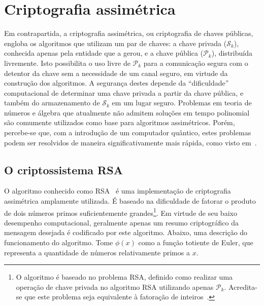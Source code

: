 \documentclass[12pt]{report}
\newcommand{\pk}{$\mathcal{P}_k$}
\newcommand{\sk}{$\mathcal{S}_k$}
\begin{document}
\section{Criptografia assimétrica}

Em contrapartida, a criptografia assimétrica, ou criptografia de chaves
públicas, engloba os algoritmos que utilizam um par de chaves: a chave privada
(\sk{}), conhecida apenas pela entidade que a gerou, e a chave pública (\pk{}),
distribuída livremente. Isto possibilita o uso livre de \pk{} para a
comunicação segura com o detentor da chave sem a necessidade de um canal
seguro, em virtude da construção dos algoritmos. A segurança destes depende da
``dificuldade'' computacional de determinar uma chave privada a partir da chave
pública, e também do armazenamento de \sk{} em um lugar seguro. Problemas em
teoria de números e álgebra que atualmente não admitem soluções em tempo
polinomial são comumente utilizados como base para algoritmos assimétricos.
Porém, percebe-se que, com a introdução de um computador quântico, estes
problemas podem ser resolvidos de maneira significativamente mais rápida, como
visto em~\cite{Shor:1997:PAP:264393.264406}.

\subsection{O criptossistema RSA}

O algoritmo conhecido como RSA~\cite{Rivest:1978:MOD:359340.359342} é uma
implementação de criptografia assimétrica amplamente utilizada. É baseado na
dificuldade de fatorar o produto de dois números primos suficientemente
grandes\footnote{O algoritmo é baseado no problema RSA, definido como realizar
uma operação de chave privada no algoritmo RSA utilizando apenas \pk{}.
Acredita-se que este problema seja equivalente à fatoração de 
inteiros~\cite[3.30]{Menezes:1996:HAC:548089}.}. Em virtude de seu baixo desempenho
computacional, geralmente apenas um resumo criptográfico da mensagem desejada é
codificado por este algoritmo. Abaixo, uma descrição do funcionamento do
algoritmo. Tome $\phi(x)$ como a função totiente de Euler, que representa a
quantidade de números relativamente primos a $x$.
\end{document}
